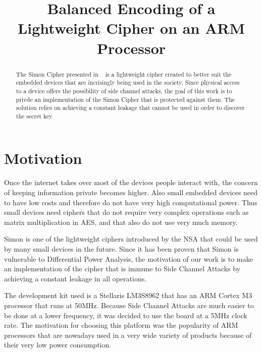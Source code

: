 \documentclass[conference]{IEEEtran}
\begin{document}
\title{Balanced Encoding of a Lightweight Cipher on an ARM Processor}


\author{
}
\maketitle

\begin{abstract}

  The Simon Cipher presented in ~\cite{Beaulieu_Simon} is a lightweight cipher created to better suit the embedded devices that are incrisingly being used in the society. Since physical access to a device offers the possibility of side channel attacks, the goal of this work is to privde an implementation of the Simon Cipher that is protected against them. The solution relies on achieving a constant leakage that cannot be used in order to discover the secret key.

\end{abstract}

\section{Motivation}

Once the internet takes over most of the devices people interact with, the concern of keeping information private becomes higher. Also small embedded devices need to have low costs and therefore do not have very high computational power. Thus small devices need ciphers that do not require very complex operations such as matrix multiplication in AES, and that also do not use very much memory.

Simon is one of the lightweight ciphers introduced by the NSA that could be used by many small devices in the future. Since it has been proven that Simon is vulnerable to Differential Power Analysis, the motivation of our work is to make an implementation of the cipher that is immune to Side Channel Attacks by achieving a constant leakage in all operations.

The development kit used is a Stellaris LM3S8962 that has an ARM Cortex M3 processor that runs at 50MHz. Because Side Channel Attacks are much easier to be done at a lower frequency, it was decided to use the board at a 5MHz clock rate. The motivation for choosing this platform was the popularity of ARM processors that are nowadays used in a very wide variety of products because of their very low power consumption.
\end{document}
